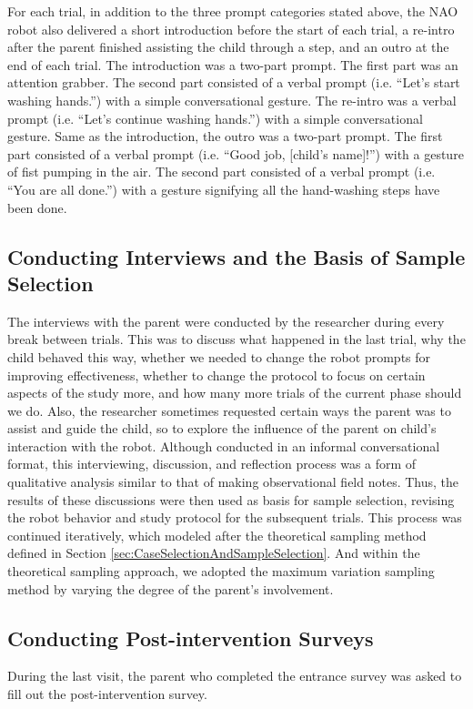 For each trial, in addition to the three prompt categories stated above, the NAO robot also delivered a short introduction before the start of each trial, a re-intro after the parent finished assisting the child through a step, and an outro at the end of each trial. The introduction was a two-part prompt. The first part was an attention grabber. The second part consisted of a verbal prompt (i.e. “Let's start washing hands.”) with a simple conversational gesture. The re-intro was a verbal prompt (i.e. “Let's continue washing hands.”) with a simple conversational gesture. Same as the introduction, the outro was a two-part prompt. The first part consisted of a verbal prompt (i.e. “Good job, [child's name]!”) with a gesture of fist pumping in the air. The second part consisted of a verbal prompt (i.e. “You are all done.”) with a gesture signifying all the hand-washing steps have been done.

\subsection{Conducting Interviews and the Basis of Sample Selection}
\label{sec:ConductingInterviews}
The interviews with the parent were conducted by the researcher during every break between trials.  This was to discuss what happened in the last trial, why the child behaved this way, whether we needed to change the robot prompts for improving effectiveness, whether to change the protocol to focus on certain aspects of the study more, and how many more trials of the current phase should we do.  Also, the researcher sometimes requested certain ways the parent was to assist and guide the child, so to explore the influence of the parent on child's interaction with the robot.  Although conducted in an informal conversational format, this interviewing, discussion, and reflection process was a form of qualitative analysis similar to that of making observational field notes.  Thus, the results of these discussions were then used as basis for sample selection, revising the robot behavior and study protocol for the subsequent trials.  This process was continued iteratively, which modeled after the theoretical sampling method defined in Section \ref{sec:CaseSelectionAndSampleSelection}.  And within the theoretical sampling approach, we adopted the maximum variation sampling method by varying the degree of the parent's involvement.

\subsection{Conducting Post-intervention Surveys}
During the last visit, the parent who completed the entrance survey was asked to fill out the post-intervention survey.

